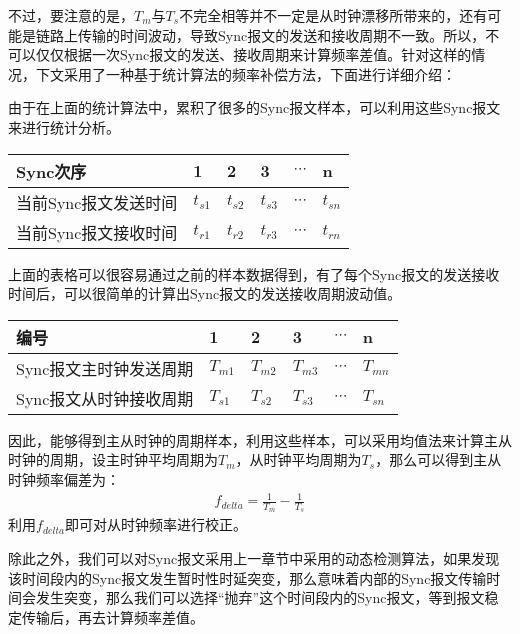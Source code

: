 不过，要注意的是，$T_{m}$与$T_{s}$不完全相等并不一定是从时钟漂移所带来的，还有可能是链路上传输的时间波动，导致Sync报文的发送和接收周期不一致。所以，不可以仅仅根据一次Sync报文的发送、接收周期来计算频率差值。针对这样的情况，下文采用了一种基于统计算法的频率补偿方法，下面进行详细介绍：

由于在上面的统计算法中，累积了很多的Sync报文样本，可以利用这些Sync报文来进行统计分析。
\begin{table}[htpb]
  \centering
  \begin{tabular}{llllll} \toprule
    Sync次序 & 1 & 2 & 3 & $\cdots$ & n \\ \midrule
    当前Sync报文发送时间 & $t_{s1}$ & $t_{s2}$ & $t_{s3}$ & $\cdots$ & $t_{sn}$ \\ \midrule
    当前Sync报文接收时间 & $t_{r1}$ & $t_{r2}$ & $t_{r3}$ & $\cdots$ & $t_{rn}$  \\ \bottomrule
  \end{tabular}
\end{table}

上面的表格可以很容易通过之前的样本数据得到，有了每个Sync报文的发送接收时间后，可以很简单的计算出Sync报文的发送接收周期波动值。
\begin{table}[htpb]
  \centering
  \begin{tabular}{llllll} \toprule
    编号 & 1 & 2 & 3 & $\cdots$ & n \\ \midrule
    Sync报文主时钟发送周期 & $T_{m1}$ & $T_{m2}$ & $T_{m3}$ & $\cdots$ & $T_{mn}$ \\ \midrule
    Sync报文从时钟接收周期 & $T_{s1}$ & $T_{s2}$ & $T_{s3}$ & $\cdots$ & $T_{sn}$  \\ \bottomrule
  \end{tabular}
\end{table}

因此，能够得到主从时钟的周期样本，利用这些样本，可以采用均值法来计算主从时钟的周期，设主时钟平均周期为$T_{m}$，从时钟平均周期为$T_{s}$，那么可以得到主从时钟频率偏差为：
\begin {align}
f_{delta} = \frac{1}{T_{m}} - \frac{1}{T_{s}}
\end{align}
利用$f_{delta}$即可对从时钟频率进行校正。

除此之外，我们可以对Sync报文采用上一章节中采用的动态检测算法，如果发现该时间段内的Sync报文发生暂时性时延突变，那么意味着内部的Sync报文传输时间会发生突变，那么我们可以选择“抛弃”这个时间段内的Sync报文，等到报文稳定传输后，再去计算频率差值。

